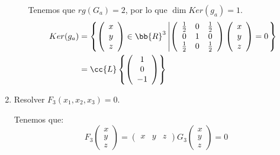 \documentclass[12pt]{article}
\begin{document}
\begin{ejercicio}
\begin{enumerate}
\begin{itemize}
            Tenemos que $rg(G_a)=2$, por lo que $\dim Ker(g_a) = 1$.
            \begin{equation*}
                \begin{split}
                    Ker(g_a) &= \left\{\left(\begin{array}{c}
                        x \\ y \\ z
                    \end{array}\right)\in \bb{R}^3 \left|
                    \left(\begin{array}{ccc}
                        \frac{1}{2} & 0 & \frac{1}{2} \\
                        0 & 1 & 0 \\
                        \frac{1}{2} & 0 & \frac{1}{2}
                    \end{array}\right)
                    \left(\begin{array}{c}
                        x \\ y \\ z
                    \end{array}\right) = 0
                    \right.\right\} \\
                    &= \cc{L}\left\{\left(\begin{array}{c}
                        1 \\ 0 \\ -1
                    \end{array}\right)\right\}
                \end{split}
            \end{equation*}
        \end{itemize}

        \item Resolver $F_3(x_1, x_2, x_3) = 0$.


        Tenemos que:
        \begin{equation*}
            F_3\left(\begin{array}{c}
                        x \\ y \\ z
                    \end{array}\right)
            =\left(\begin{array}{cccc}
                        x & y & z
                    \end{array}\right) 
            G_3
            \left(\begin{array}{c}
                        x \\ y \\ z
                    \end{array}\right) = 0
        \end{equation*}


\end{enumerate}
\end{ejercicio}
\end{document}
